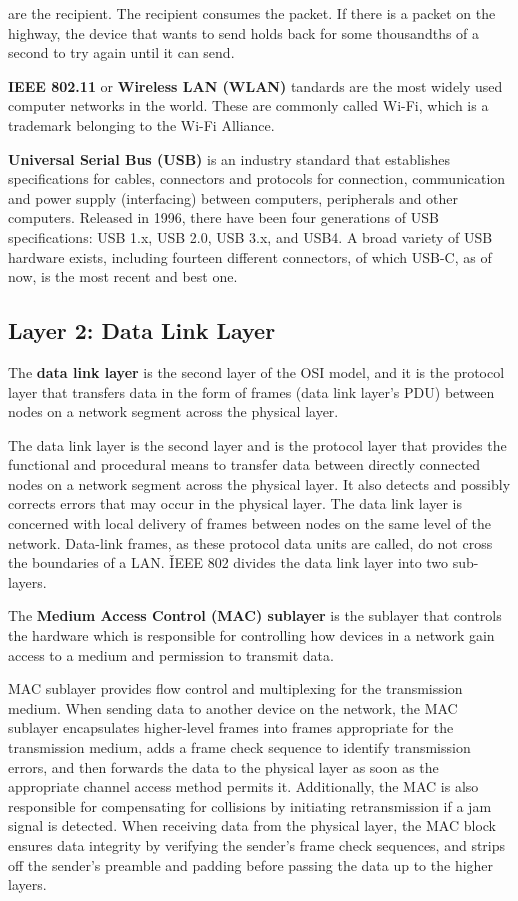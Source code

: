 are the recipient. The recipient consumes the packet. If there is a packet on the highway, the device that wants to
send holds back for some thousandths of a second to try again until it can send.
\item \textbf{IEEE 802.11} or \textbf{Wireless LAN (WLAN)} tandards are the most widely used computer networks in the
world. These are commonly called Wi-Fi, which is a trademark belonging to the Wi-Fi Alliance.
\item \textbf{Universal Serial Bus (USB)} is an industry standard that establishes specifications for cables,
connectors and protocols for connection, communication and power supply (interfacing) between computers, peripherals
and other computers. Released in 1996, there have been four generations of USB specifications: USB 1.x, USB 2.0, USB
3.x, and USB4. A broad variety of USB hardware exists, including fourteen different connectors, of which USB-C, as of
now, is the most recent and best one.
\eit

\subsection{Layer 2: Data Link Layer}

The \textbf{data link layer} is the second layer of the OSI model, and it is the protocol layer that transfers data
in the form of frames (data link layer's PDU) between nodes on a network segment across the physical layer.
\ed

The data link layer is the second layer and is the protocol layer that provides the functional and procedural means
to transfer data between directly connected nodes on a network segment across the physical layer. It also detects and
possibly corrects errors that may occur in the physical layer. The data link layer is concerned with local delivery
of frames between nodes on the same level of the network. Data-link frames, as these protocol data units are called,
do not cross the boundaries of a LAN. \v

IEEE 802 divides the data link layer into two sub-layers.

The \textbf{Medium Access Control (MAC) sublayer} is the sublayer that controls the hardware which is responsible for
controlling how devices in a network gain access to a medium and permission to transmit data.
\ed

MAC sublayer provides flow control and multiplexing for the transmission medium. When sending data to another device
on the network, the MAC sublayer encapsulates higher-level frames into frames appropriate for the transmission
medium, adds a frame check sequence to identify transmission errors, and then forwards the data to the physical layer
as soon as the appropriate channel access method permits it. Additionally, the MAC is also responsible for
compensating for collisions by initiating retransmission if a jam signal is detected. When receiving data from the
physical layer, the MAC block ensures data integrity by verifying the sender's frame check sequences, and strips off
the sender's preamble and padding before passing the data up to the higher layers.

